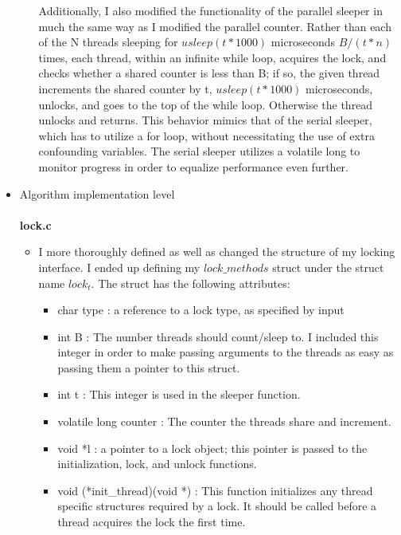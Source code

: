 \documentclass[]{article}
\begin{document}
\begin{itemize}
\begin{itemize}
		Additionally, I also modified the functionality of the parallel sleeper in much the same way as I modified the parallel counter. Rather than each of the N threads sleeping for $usleep(t * 1000)$ microseconds $B / (t * n)$ times, each thread, within an infinite while loop, acquires the lock, and checks whether a shared counter is less than B; if so, the given thread increments the shared counter by t,  $usleep(t * 1000)$ microseconds, unlocks, and goes to the top of the while loop. Otherwise the thread unlocks and returns.
		This behavior mimics that of the serial sleeper, which has to utilize a for loop, without necessitating the use of extra confounding variables. The serial sleeper utilizes a volatile long to monitor progress in order to equalize performance even further.
	\end{itemize}
	\item Algorithm implementation level
	\\\\
	\textbf{lock.c}
	\begin{itemize}
		\item  I more thoroughly defined as well as changed the structure of my locking interface. I ended up defining my $lock\_methods$ struct under the struct name $lock_t$. The struct has the following attributes:
		\begin{itemize}
			\item char type : a reference to a lock type, as specified by input
			
			\item int B : The number threads should count/sleep to. I included this integer in order to make passing arguments to the threads as easy as passing them a pointer to this struct.
			
			
			\item int t : This integer is used in the sleeper function. 
			
			\item volatile long counter : The counter the threads share and increment.
			
			\item void *l : a pointer to a lock object; this pointer is passed to the initialization, lock, and unlock functions.
			
			\item void (*init\_thread)(void *) : This function initializes any thread specific structures required by a lock. It should be called before a thread acquires the lock the first time.
			

\end{itemize}
\end{itemize}
\end{itemize}
\end{document}
